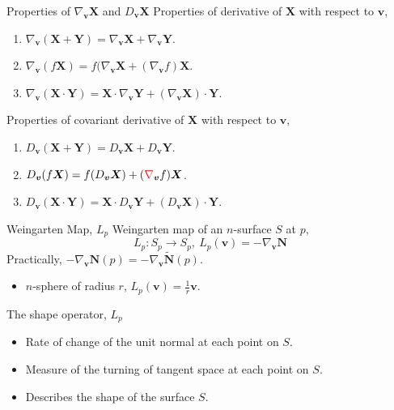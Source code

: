 \documentclass{beamer}
\begin{document}
\begin{frame}{Properties of $\nabla_{\boldsymbol{v}} \boldsymbol{X}$ and $D_{\boldsymbol{v}} \boldsymbol{X}$}
	Properties of derivative of $\boldsymbol{X}$ with respect to $\boldsymbol{v}$,
	\begin{enumerate}
		\item $\nabla_{\boldsymbol{v}} (\boldsymbol{X}+\boldsymbol{Y}) = \nabla_{\boldsymbol{v}} \boldsymbol{X} + \nabla_{\boldsymbol{v}} \boldsymbol{Y}$.
		\item $\nabla_{\boldsymbol{v}} (f\boldsymbol{X}) = f (\nabla_{\boldsymbol{v}} \boldsymbol{X} + (\nabla_{\boldsymbol{v}} f) \boldsymbol{X}$.
		\item $\nabla_{\boldsymbol{v}} (\boldsymbol{X} \cdot \boldsymbol{Y}) = \boldsymbol{X} \cdot \nabla_{\boldsymbol{v}} \boldsymbol{Y} + (\nabla_{\boldsymbol{v}} \boldsymbol{X}) \cdot \boldsymbol{Y}$.
	\end{enumerate}
	\vfill
	Properties of covariant derivative of $\boldsymbol{X}$ with respect to $\boldsymbol{v}$,
	\begin{enumerate}
		\item $D_{\boldsymbol{v}} (\boldsymbol{X}+\boldsymbol{Y}) = D_{\boldsymbol{v}} \boldsymbol{X} + D_{\boldsymbol{v}} \boldsymbol{Y}$.
		\item $D_{\boldsymbol{v}} (f\boldsymbol{X}) = f (D_{\boldsymbol{v}} \boldsymbol{X}) + (\textcolor{red}{\nabla}_{\boldsymbol{v}} f) \boldsymbol{X}$.
		\item $D_{\boldsymbol{v}} (\boldsymbol{X} \cdot \boldsymbol{Y}) = \boldsymbol{X} \cdot D_{\boldsymbol{v}} \boldsymbol{Y} + (D_{\boldsymbol{v}} \boldsymbol{X}) \cdot \boldsymbol{Y}$.
	\end{enumerate}
\end{frame}

\begin{frame}{Weingarten Map, $L_p$}
	Weingarten map of an $n$-surface $S$ at $p$,
	$$ L_p : S_p \to S_p,\ L_p(\boldsymbol{v}) = -\nabla_{\boldsymbol{v}} \boldsymbol{N} $$
	\vfill
	Practically, $-\nabla_{\boldsymbol{v}} \boldsymbol{N}(p) = -\nabla_{\boldsymbol{v}} \tilde{\boldsymbol{N}}(p)$.\\
	\begin{itemize}
		\item $n$-sphere of radius $r$, $L_p(\boldsymbol{v}) = \frac{1}{r} \boldsymbol{v}$.
	\end{itemize}
	\vfill
	The shape operator, $L_p$
	\begin{itemize}
		\item Rate of change of the unit normal at each point on $S$.
		\item Measure of the turning of tangent space at each point on $S$.
		\item Describes the shape of the surface $S$.
	\end{itemize}
\end{frame}
\end{document}
